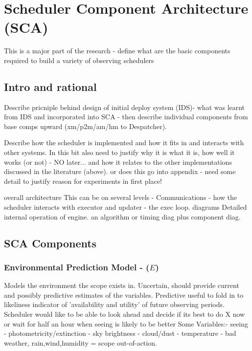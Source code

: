 \section{Scheduler Component Architecture (SCA)}
\label{sect:sched_comp_study}
This is a major part of the research - define what are the basic components required to build a variety of observing schedulers

\subsection{Intro and rational}
Describe pricniple behind design of initial deploy system (IDS)- what was learnt from IDS and incorporated into SCA - then describe individual components from base comps upward (xm/p2m/am/hm to Despatcher).

Describe how the scheduler is implemented and how it fits in and interacts with other systems. In this bit also need to justify why it is what it is, how well it works (or not) - NO later... and how it relates to the other implementations discussed in the literature (above). or does this go into appendix - need some detail to justify reason for experiments in first place!

overall architecture
This can be on several levels -
Communications - how the scheduler interacts with executor and updater - the exec loop. diagrams
Detailed internal operation of engine. an algorithm or timing diag plus component diag.



\subsection{SCA Components}

\subsubsection{Environmental Prediction Model - ($E$)}
Models the environment the scope exists in. Uncertain, should provide current and possibly predictive estimates of the variables. Predictive useful to fold in to likeliness indicator of 'availability and utility' of future observing periods. Scheduler would like to be able to look ahead and decide if its best to do X now or wait for half an hour when seeing is likely to be better
Some Variables:-
seeing - photometricity/extinction \cite{lapalma31,lapalma115} - sky brightness \cite{krisciunas91brightness,krisciunas97optical} - cloud/dust - temperature - bad weather, rain,wind,humidity = scope out-of-action.

